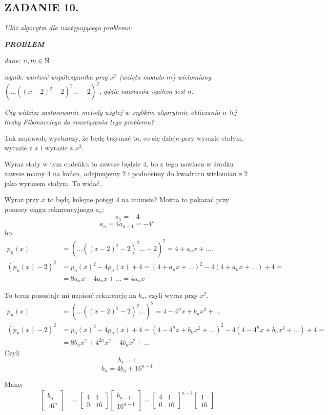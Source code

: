 \documentclass{article}
\begin{document}
\subsection*{ZADANIE 10.}
\emph{Ułóż algorytm dla następującego problemu:}

\emph{\textbf{PROBLEM}}

\emph{dane: $n,m\in\mathbb{N}$}

\emph{wynik: wartość współczynnika przy $x^2$ (wzięta modulo $m$) wielomiany $(...((x-2)^2-2)^2...-2)^2$, gdzie nawiasów ogółem jest $n$.}

\emph{Czy widzisz zastosowanie metody użytej w szybkim algorytmie obliczania $n$-tej liczby Fibonacciego do rozwiązania tego problemu?}
\medskip

Tak naprawdę wystarczy, że będę trzymać to, co się dzieje przy wyrazie stałym, wyrazie z $x$ i wyrazie z $x^2$. 

Wyraz stały w tym cudeńku to zawsze będzie $4$, bo z tego nawiasu w środku zawsze mamy $4$ na końcu, odejmujemy $2$ i podnosimy do kwadratu wielomian z $2$ jako wyrazem stałym. To widać. 

Wyraz przy $x$ to będą kolejne potęgi $4$ na minusie? Można to pokazać przy pomocy ciągu rekurencyjnego $a_n$:
$$a_1=-4$$
$$a_n=4a_{n-1}=-4^n$$
bo
\begin{align*}
    p_n(x)&=(...((x-2)^2-2)^2...-2)^2=4+a_nx+....\\
    (p_n(x)-2)^2&=p_n(x)^2-4p_n(x)+4=(4+a_nx+...)^2-4(4+a_nx+...)+4=\\
    &=8a_nx-4a_nx+...=4a_nx
\end{align*}

To teraz pozostaje mi napisać rekurencję na $b_n$, czyli wyraz przy $x^2$.
\begin{align*}
    p_n(x)&=(...((x-2)^2-2)^2...)^2=4-4^nx+b_nx^2+...\\
    (p_n(x)-2)^2&=p_n(x)^2-4p_n(x)+4=(4-4^nx+b_nx^2+...)^2-4(4-4^nx+b_nx^2+...)+4=\\
    &=8b_nx^2+4^{2n}x^2-4b_nx^2+...
\end{align*}
Czyli
$$b_1=1$$
$$b_n=4b_n+16^{n-1}$$

Mamy
\begin{align*}
    \begin{bmatrix}
        b_n\\16^n
    \end{bmatrix}&=\begin{bmatrix}
        4 & 1\\
        0 & 16
    \end{bmatrix}\begin{bmatrix}
        b_{n-1}\\16^{n-1}
    \end{bmatrix}=\begin{bmatrix}
        4 & 1\\
        0 & 16
    \end{bmatrix}^{n-1}\begin{bmatrix}
        1\\
        16
    \end{bmatrix}
\end{align*}
\end{document}
